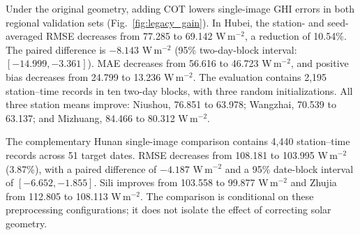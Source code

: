 \documentclass[11pt]{article}
\begin{document}
Under the original geometry, adding COT lowers single-image GHI errors in both regional validation sets (Fig.~\ref{fig:legacy_gain}). In Hubei, the station- and seed-averaged RMSE decreases from 77.285 to 69.142 W\,m$^{-2}$, a reduction of 10.54\%. The paired difference is $-8.143$ W\,m$^{-2}$ (95\% two-day-block interval: $[-14.999,-3.361]$). MAE decreases from 56.616 to 46.723 W\,m$^{-2}$, and positive bias decreases from 24.799 to 13.236 W\,m$^{-2}$. The evaluation contains 2,195 station--time records in ten two-day blocks, with three random initializations. All three station means improve: Niushou, 76.851 to 63.978; Wangzhai, 70.539 to 63.137; and Mizhuang, 84.466 to 80.312 W\,m$^{-2}$.

The complementary Hunan single-image comparison contains 4,440 station--time records across 51 target dates. RMSE decreases from 108.181 to 103.995 W\,m$^{-2}$ (3.87\%), with a paired difference of $-4.187$ W\,m$^{-2}$ and a 95\% date-block interval of $[-6.652,-1.855]$. Sili improves from 103.558 to 99.877 W\,m$^{-2}$ and Zhujia from 112.805 to 108.113 W\,m$^{-2}$. The comparison is conditional on these preprocessing configurations; it does not isolate the effect of correcting solar geometry.
\end{document}
